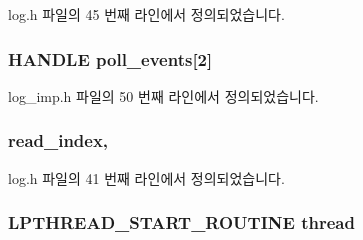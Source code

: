 log.\+h 파일의 45 번째 라인에서 정의되었습니다.

\subsubsection[{\texorpdfstring{poll\+\_\+events}{poll_events}}]{\setlength{\rightskip}{0pt plus 5cm}H\+A\+N\+D\+LE poll\+\_\+events\mbox{[}2\mbox{]}\hspace{0.3cm}{\ttfamily [private]}}\hypertarget{classavdecc__lib_1_1log__imp_a7178c7ad92d526f120bd0ae68b50f53e}{}\label{classavdecc__lib_1_1log__imp_a7178c7ad92d526f120bd0ae68b50f53e}


log\+\_\+imp.\+h 파일의 50 번째 라인에서 정의되었습니다.

\subsubsection[{\texorpdfstring{read\+\_\+index}{read_index}}]{ read\+\_\+index\hspace{0.3cm}{\ttfamily [protected]}, {\ttfamily [inherited]}}\hypertarget{classavdecc__lib_1_1log_a2ccf0f8cb3b20ac18cc9c7bcff1084ad}{}\label{classavdecc__lib_1_1log_a2ccf0f8cb3b20ac18cc9c7bcff1084ad}


log.\+h 파일의 41 번째 라인에서 정의되었습니다.

\subsubsection[{\texorpdfstring{thread}{thread}}]{\setlength{\rightskip}{0pt plus 5cm}L\+P\+T\+H\+R\+E\+A\+D\+\_\+\+S\+T\+A\+R\+T\+\_\+\+R\+O\+U\+T\+I\+NE thread\hspace{0.3cm}{\ttfamily [private]}}\hypertarget{classavdecc__lib_1_1log__imp_aa930d342e4c53bcc9bf4da7995c81a3b}{}\label{classavdecc__lib_1_1log__imp_aa930d342e4c53bcc9bf4da7995c81a3b}


